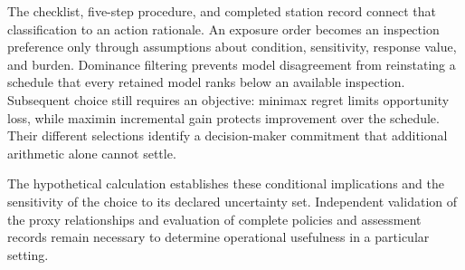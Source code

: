 \documentclass[symmetry,article,submit,pdftex,oneauthor]{Definitions/mdpi}
\begin{document}
The checklist, five-step procedure, and completed station record connect that classification to an action rationale. An exposure order becomes an inspection preference only through assumptions about condition, sensitivity, response value, and burden. Dominance filtering prevents model disagreement from reinstating a schedule that every retained model ranks below an available inspection. Subsequent choice still requires an objective: minimax regret limits opportunity loss, while maximin incremental gain protects improvement over the schedule. Their different selections identify a decision-maker commitment that additional arithmetic alone cannot settle.

The hypothetical calculation establishes these conditional implications and the sensitivity of the choice to its declared uncertainty set. Independent validation of the proxy relationships and evaluation of complete policies and assessment records remain necessary to determine operational usefulness in a particular setting.
\end{document}
